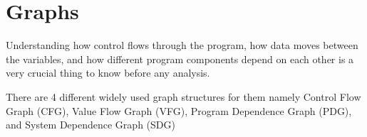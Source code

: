 \section{Graphs}
Understanding how control flows through the program, how data moves between the variables, and how different program components
depend on each other is a very crucial thing to know before any analysis.

There are 4 different widely used graph structures for them namely Control Flow Graph (CFG), Value Flow Graph (VFG), Program Dependence Graph (PDG), and System Dependence Graph (SDG)